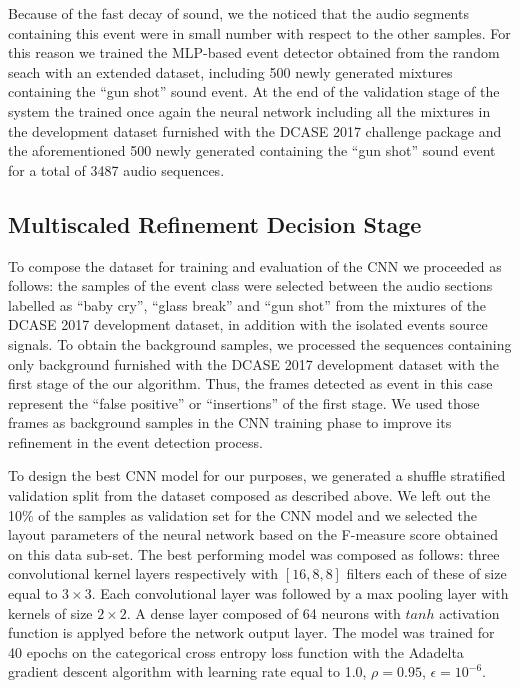 \documentclass{article}
\begin{document}
\begin{sloppy}
Because of the fast decay of  sound, we the noticed that the audio segments containing this event were in small number with respect to the other samples. For this reason we trained the MLP-based event detector obtained from the random seach with an extended dataset, including 500 newly generated mixtures containing the ``gun shot'' sound event.
At the end of the validation stage of the system the trained once again the neural network including all the mixtures in the development dataset furnished with the DCASE 2017 challenge package and the aforementioned 500 newly generated containing the ``gun shot'' sound event for a total of 3487 audio sequences.

\subsection{Multiscaled Refinement Decision Stage}
%

To compose the dataset for training and evaluation of the CNN we proceeded as follows: the samples of the event class were selected between the audio sections labelled as ``baby cry'', ``glass break'' and ``gun shot'' from the mixtures of the DCASE 2017 development dataset, in addition with the isolated events source signals. To obtain the background samples, we processed the sequences containing only background furnished with the DCASE 2017 development dataset with the first stage of the our algorithm. Thus, the frames detected as event in this case represent the ``false positive'' or ``insertions'' of the first stage. We used those frames as background samples in the CNN training phase to improve its refinement in the event detection process. 

To design the best CNN model for our purposes, we generated a shuffle stratified validation split from the dataset composed as described above. We left out the 10\% of the samples as validation set for the CNN model and we selected the layout parameters of the neural network based on the F-measure score obtained on this data sub-set. The best performing model was composed as follows: three convolutional kernel layers respectively with $[16, 8, 8]$ filters each of these of size equal to $3\times3$. Each convolutional layer was followed by a max pooling layer with kernels of size $2\times2$. A dense layer composed of 64 neurons with $tanh$ activation function is applyed before the network output layer. The model was trained for 40 epochs on the categorical cross entropy loss function with the Adadelta gradient descent algorithm with learning rate equal to 1.0, $\rho=0.95$, $\epsilon=10^{-6}$.



\end{sloppy}
\end{document}
